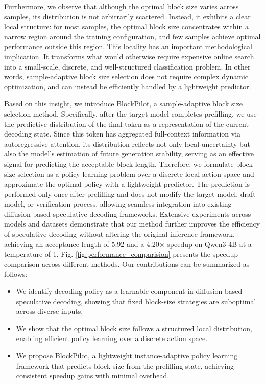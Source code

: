 \documentclass{llmxive}
\begin{document}
Furthermore, we observe that although the optimal block size varies across samples, its distribution is not arbitrarily scattered. Instead, it exhibits a clear local structure: for most samples, the optimal block size concentrates within a narrow region around the training configuration, and few samples achieve optimal performance outside this region. This locality has an important methodological implication. It transforms what would otherwise require expensive online search into a small-scale, discrete, and well-structured classification problem. In other words, sample-adaptive block size selection does not require complex dynamic optimization, and can instead be efficiently handled by a lightweight predictor.

Based on this insight, we introduce BlockPilot, a sample-adaptive block size selection method. Specifically, after the target model completes prefilling, we use the predictive distribution of the final token as a representation of the current decoding state. Since this token has aggregated full-context information via autoregressive attention, its distribution reflects not only local uncertainty but also the model’s estimation of future generation stability, serving as an effective signal for predicting the acceptable block length. Therefore, we formulate block size selection as a policy learning problem over a discrete local action space and approximate the optimal policy with a lightweight predictor. The prediction is performed only once after prefilling and does not modify the target model, draft model, or verification process, allowing seamless integration into existing diffusion-based speculative decoding frameworks. Extensive experiments across models and datasets demonstrate that our method further improves the efficiency of speculative decoding without altering the original inference framework, achieving an acceptance length of 5.92 and a 4.20$\times$ speedup on Qwen3-4B at a temperature of 1. Fig. \ref{fig:performance_comparision} presents the speedup comparison across different methods. Our contributions can be summarized as follows:
\begin{itemize}[leftmargin=*]
    \item We identify decoding policy as a learnable component in diffusion-based speculative decoding, showing that fixed block-size strategies are suboptimal across diverse inputs.
    \item We show that the optimal block size follows a structured local distribution, enabling efficient policy learning over a discrete action space.
    \item We propose BlockPilot, a lightweight instance-adaptive policy learning framework that predicts block size from the prefilling state, achieving consistent speedup gains with minimal overhead.
\end{itemize}
\end{document}
